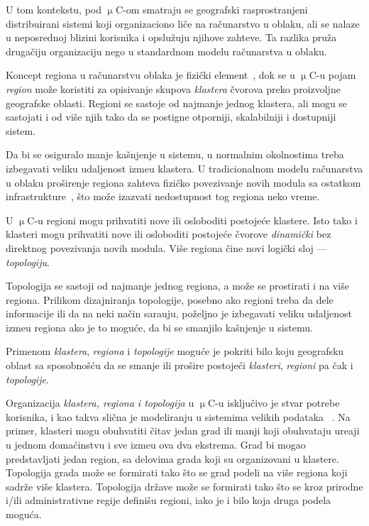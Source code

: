 U tom kontekstu, pod $\upmu$C-om smatraju se geografski rasprostranjeni distribuirani sistemi koji organizaciono li\v ce na ra\v cunarstvo u oblaku, ali se nalaze u neposrednoj blizini korisnika i opslu\v zuju njihove zahteve. Ta razlika pru\v za druga\v ciju organizaciju nego u standardnom modelu ra\v cunarstva u oblaku. 

Koncept regiona u ra\v cunarstvu oblaka je fizi\v cki element~\cite{SouzaMFAK19}, dok se u $\upmu$C-u pojam \emph{region} mo\v ze koristiti za opisivanje skupova \emph{klastera} \v cvorova preko proizvoljne geografske oblasti. Regioni se sastoje od najmanje jednog klastera, ali mogu se sastojati i od vi\v se njih tako da se postigne otporniji, skalabilniji i dostupniji sistem. 

Da bi se osiguralo manje ka\v snjenje u sistemu, u normalnim okolnostima treba izbegavati veliku udaljenost izme\dj u klastera. U tradicionalnom modelu ra\v cunarstva u oblaku pro\v sirenje regiona zahteva fizi\v cko povezivanje novih modula sa ostatkom infrastrukture~\cite{Hamilton07}, \v sto mo\v ze izazvati nedostupnost tog regiona neko vreme.
 
U $\upmu$C-u regioni mogu prihvatiti nove ili osloboditi postoje\'ce klastere. Isto tako i klasteri mogu prihvatiti nove ili osloboditi postoje\'ce \v cvorove \emph{dinami\v cki} bez direktnog povezivanja novih modula. Vi\v se regiona \v cine novi logički sloj --– \emph{topologiju}. 

Topologija se sastoji od najmanje jednog regiona, a mo\v ze se prostirati i na vi\v se regiona. Prilikom dizajniranja topologije, posebno ako regioni treba da dele informacije ili da na neki na\v cin sara\dj uju, po\v zeljno je izbegavati veliku udaljenost izme\dj u regiona ako je to mogu\'ce, da bi se smanjilo ka\v snjenje u sistemu. 

Primenom  \emph{klastera}, \emph{regiona} i \emph{topologije} mogu\'ce je pokriti bilo koju geografsku oblast sa sposobno\v s\'cu da se smanje ili pro\v sire postoje\'ci \emph{klasteri}, \emph{regioni} pa \v cak i \emph{topologije}.  

Organizacija \emph{klastera, regiona i topologija} u $\upmu$C-u isklju\v civo je stvar potrebe korisnika, i kao takva sli\v cna je modeliranju u sistemima velikih podataka ~\cite{SonbolOAA20, WangCAL14}. Na primer, klasteri mogu obuhvatiti \v citav jedan grad ili manji koji obuhvataju ure\dj aji u jednom doma\'cinstvu i sve izme\dj u ova dva ekstrema. Grad bi mogao predstavljati jedan region, sa delovima grada koji su organizovani u klastere. Topologija grada mo\v ze se formirati tako \v sto se grad podeli na vi\v se regiona koji sadr\v ze vi\v se klastera. Topologija dr\v zave mo\v ze se formirati tako \v sto se kroz prirodne i/ili administrativne regije defini\v su regioni, iako je i bilo koja druga podela mogu\'ca.

